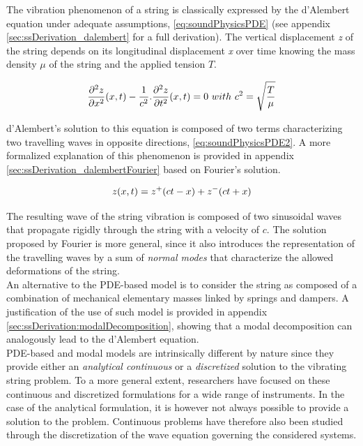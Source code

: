 {{The vibration phenomenon of a string is classically expressed by the d'Alembert equation under adequate assumptions, \myequname \eqref{eq:soundPhysicsPDE} (see appendix \ref{sec:ssDerivation_dalembert} for a full derivation). The vertical displacement \emph{z} of the string depends on its longitudinal displacement \emph{x} over time knowing the mass density $\mu$ of the string and the applied tension $T$.

\begin{equation}
	\frac{\partial^2{z}}{\partial{x^2}}(x, t) - \frac{1}{c^2} . \frac{\partial^2{z}}{\partial{t^2}}(x, t) = 0\ with\ c^2 = \sqrt{\frac{T}{\mu}} 
\label{eq:soundPhysicsPDE}
\eqcaption{1-D d'Alembert equation}
\end{equation}

d'Alembert's solution to this equation is composed of two terms characterizing two travelling waves in opposite directions, \myequname \eqref{eq:soundPhysicsPDE2}. A more formalized explanation of this phenomenon is provided in appendix \ref{sec:ssDerivation_dalembertFourier} based on Fourier's solution.

\begin{equation}
	z(x, t) = z^{+}(ct - x) + z^{-}(ct + x) 
\label{eq:soundPhysicsPDE2}
\eqcaption{1-D d'Alembert travelling waves solution}
\end{equation}

The resulting wave of the string vibration is composed of two sinusoidal waves that propagate rigidly through the string with a velocity of $c$. The solution proposed by Fourier is more general, since it also introduces the representation of the travelling waves by a sum of \emph{normal modes} that characterize the allowed deformations of the string.\\

An alternative to the PDE-based model is to consider the string as composed of a combination of mechanical elementary masses linked by springs and dampers. A justification of the use of such model is provided in appendix \ref{sec:ssDerivation:modalDecomposition}, showing that a modal decomposition can analogously lead to the d'Alembert equation.\\

PDE-based and modal models are intrinsically different by nature since they provide either an \emph{analytical continuous} or a \emph{discretized} solution to the vibrating string problem. To a more general extent, researchers have focused on these continuous and discretized formulations for a wide range of instruments. In the case of the analytical formulation, it is however not always possible to provide a solution to the problem. Continuous problems have therefore also been studied through the discretization of the wave equation governing the considered systems.

}}
